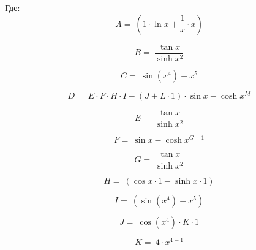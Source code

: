 \documentclass[a4paper, 12pt]{article}
\begin{document}
    Где: \\
    
            \begin{equation}
            A =~(1 \cdot  \ln x + \dfrac{1 }{ x} \cdot x)
            \end{equation}
            
            \begin{equation}
            B =~\dfrac{ \tan x }{  \sinh x ^ {2}}
            \end{equation}
            
            \begin{equation}
            C =~ \sin (x ^ {4}) + x ^ {5}
            \end{equation}
            
            \begin{equation}
            D =~E \cdot F \cdot H \cdot I - (J + L \cdot 1) \cdot  \sin x -  \cosh x ^ {M}
            \end{equation}
            
            \begin{equation}
            E =~\dfrac{ \tan x }{  \sinh x ^ {2}}
            \end{equation}
            
            \begin{equation}
            F =~ \sin x -  \cosh x ^ {G - 1}
            \end{equation}
            
            \begin{equation}
            G =~\dfrac{ \tan x }{  \sinh x ^ {2}}
            \end{equation}
            
            \begin{equation}
            H =~( \cos x \cdot 1 -  \sinh x \cdot 1)
            \end{equation}
            
            \begin{equation}
            I =~( \sin (x ^ {4}) + x ^ {5})
            \end{equation}
            
            \begin{equation}
            J =~ \cos (x ^ {4}) \cdot K \cdot 1
            \end{equation}
            
            \begin{equation}
            K =~4 \cdot x ^ {4 - 1}
            \end{equation}
            
\end{document}
